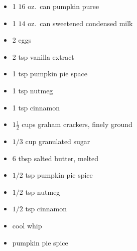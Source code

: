 \RequirePackage{../recipe}




\thispagestyle{firstpage}

\ingredients

\begin{minipage}{\textwidth}
\begin{multicols*}{2}
\begin{minipage}{\linewidth}
\ingredients[Filling]
\vspace{-1.5em}
\begin{itemize}
    \item 1 $16$ oz.\ can pumpkin puree
    \item 1 $14$ oz.\ can sweetened condensed milk
    \item 2 eggs
    \item 2 tsp vanilla extract
    \item 1 tsp pumpkin pie space
    \item 1 tsp nutmeg
    \item 1 tsp cinnamon
\end{itemize}
\end{minipage}
\columnbreak

\begin{minipage}{\linewidth}
\ingredients[Crust]
\vspace{-1.5em}
\begin{itemize}
    \item $1\frac{1}{2}$ cups graham crackers, finely ground
    \item $1/3$ cup granulated sugar
    \item $6$ tbsp salted butter, melted
    \item $1/2$ tsp pumpkin pie spice
    \item $1/2$ tsp nutmeg
    \item $1/2$ tsp cinnamon
\end{itemize}

\vspace{1em}
\ingredients[Garnish]
\vspace{-1.5em}
\begin{itemize}
    \item cool whip
    \item pumpkin pie spice
\end{itemize}
\end{minipage}
\end{multicols*}
\end{minipage}
\vspace{1em}

